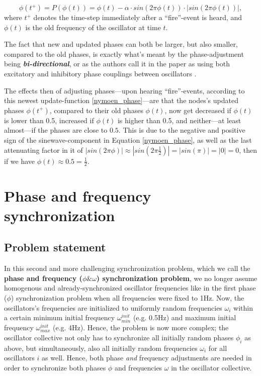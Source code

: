 		\begin{equation}
		\label{nymoen_phase}
			\phi(t^+)=P(\phi(t)) = \phi(t) - \alpha \cdot sin(2\pi\phi(t)) \cdot | sin(2\pi\phi(t)) | ,
		\end{equation} \nl
		where $t^+$ denotes the time-step immediately after a ``fire''-event is heard, and $\phi(t)$ is the old frequency of the oscillator at time $t$.

		The fact that new and updated phases can both be larger, but also smaller, compared to the old phases, is exactly what's meant by the phase-adjustment being \textbf{\textit{bi-directional}}, or as the authors call it in the paper as using both excitatory and inhibitory phase couplings between oscillators \cite{nymoen_synch}.

		The effects then of adjusting phases—upon hearing ``fire''-events, according to this newest update-function \eqref{nymoen_phase}—are that the nodes's updated phases $\phi(t^+)$, compared to their old phases $\phi(t)$, now get decreased if $\phi(t)$ is lower than 0.5, increased if $\phi(t)$ is higher than 0.5, and neither—at least almost—if the phases are close to $0.5$. This is due to the negative and positive sign of the sinewave-component in Equation \eqref{nymoen_phase}, as well as the last attenuating factor in it of $| sin(2\pi\phi) | \approx | sin(2\pi \frac{1}{2}) | = | sin(\pi) | = | 0 | = 0$, then if we have $\phi(t) \approx 0.5 = \frac{1}{2}$.




\section{Phase and frequency synchronization}
\label{sec:nymoen_freq_updates}

	\subsection{Problem statement}

	In this second and more challenging synchronization problem, which we call the \textbf{phase and frequency ($\phi \& \omega$) synchronization problem}, we no longer assume homogenous and already-synchronized oscillator frequencies like in the first phase ($\phi$) synchronization problem when all frequencies were fixed to 1Hz. Now, the oscillators's frequencies are initialized to uniformly random frequencies $\omega_i$ within a certain minimum initial frequency $\omega_{min}^{init}$ (e.g. 0.5Hz) and maximum initial frequency $\omega_{max}^{init}$ (e.g. 4Hz).
	Hence, the problem is now more complex; the oscillator collective not only has to synchronize all initially random phases $\phi_i$ as above, but simultaneously, also all initially random frequencies $\omega_i$ for all oscillators $i$ as well. Hence, both phase \textit{and} frequency adjustments are needed in order to synchronize both phases $\phi$ and frequencies $\omega$ in the oscillator collective.



